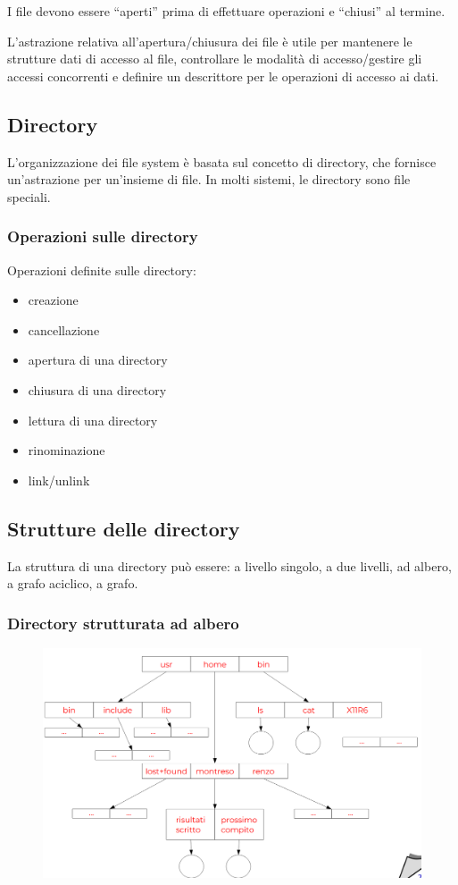 I file devono essere “aperti” prima di effettuare operazioni e “chiusi” al termine.

L’astrazione relativa all’apertura/chiusura dei file è utile per
mantenere le strutture dati di accesso al file, controllare le modalità di accesso/gestire gli accessi concorrenti e definire un descrittore per le operazioni di accesso ai dati.
\newpage
\subsection{Directory}

L'organizzazione dei file system è basata sul concetto di directory, che fornisce un'astrazione per
un'insieme di file. 
In molti sistemi, le directory sono file speciali.

\subsubsection{Operazioni sulle directory}
Operazioni definite sulle directory:
\begin{itemize}
    \item creazione
    \item cancellazione
    \item apertura di una directory
    \item chiusura di una directory
    \item lettura di una directory
    \item rinominazione
    \item link/unlink    
\end{itemize}

\subsection{Strutture delle directory}

La struttura di una directory può essere: a livello singolo, a due livelli, ad albero, a grafo aciclico, a grafo.

\subsubsection{Directory strutturata ad albero}
\begin{figure} [h]
    \centering
    \includegraphics[width=0.7\linewidth]{Images/Screenshot 2025-01-18 at 16-02-00 so-07-filesystem.pdf.png}
\end{figure}

